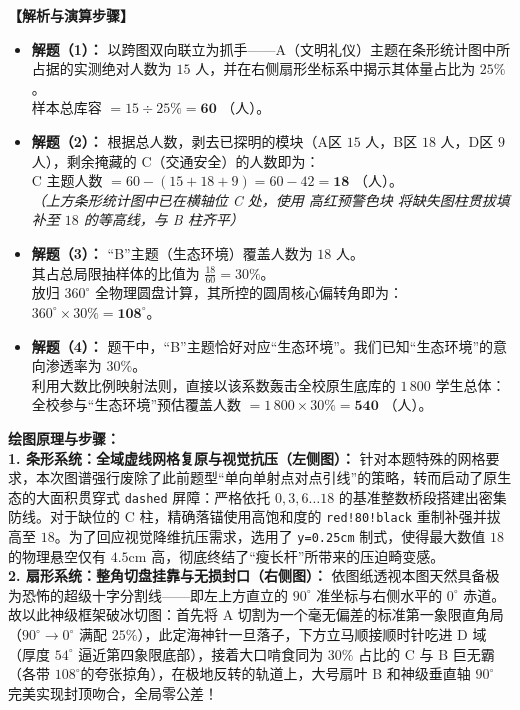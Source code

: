\documentclass[12pt, a4paper]{ctexrep}
\begin{document}
\vspace{0.4cm}
\textbf{【解析与演算步骤】}
\begin{itemize}
    \item \textbf{解题（1）：} 以跨图双向联立为抓手——A（文明礼仪）主题在条形统计图中所占据的实测绝对人数为 $15$ 人，并在右侧扇形坐标系中揭示其体量占比为 $25\%$。\\
    样本总库容 $= 15 \div 25\% = \mathbf{60}$ （人）。
    \item \textbf{解题（2）：} 根据总人数，剥去已探明的模块（A区 $15$ 人，B区 $18$ 人，D区 $9$ 人），剩余掩藏的 C（交通安全）的人数即为：\\
    C 主题人数 $= 60 - (15 + 18 + 9) = 60 - 42 = \mathbf{18}$ （人）。\\
    \textit{（上方条形统计图中已在横轴位 C 处，使用 \textcolor{red!80!black}{高红预警色块} 将缺失图柱贯拔填补至 $18$ 的等高线，与 B 柱齐平）}
    \item \textbf{解题（3）：} “B”主题（生态环境）覆盖人数为 $18$ 人。\\
    其占总局限抽样体的比值为 $\frac{18}{60} = 30\%$。\\
    放归 $360^\circ$ 全物理圆盘计算，其所控的圆周核心偏转角即为：$360^\circ \times 30\% = \mathbf{108^\circ}$。
    \item \textbf{解题（4）：} 题干中，“B”主题恰好对应“生态环境”。我们已知“生态环境”的意向渗透率为 $30\%$。\\
    利用大数比例映射法则，直接以该系数轰击全校原生底库的 $1\,800$ 学生总体：\\
    全校参与“生态环境”预估覆盖人数 $= 1\,800 \times 30\% = \mathbf{540}$ （人）。
\end{itemize}

\vspace{0.4cm}
{\small\color{blue!70!black}
\textbf{绘图原理与步骤：}\\
\textbf{1. 条形系统：全域虚线网格复原与视觉抗压（左侧图）：} 针对本题特殊的网格要求，本次图谱强行废除了此前题型“单向单射点对点引线”的策略，转而启动了原生态的大面积贯穿式 \texttt{dashed} 屏障：严格依托 $0, 3, 6 \dots 18$ 的基准整数桥段搭建出密集防线。对于缺位的 C 柱，精确落锚使用高饱和度的 \texttt{red!80!black} 重制补强并拔高至 $18$。为了回应视觉降维抗压需求，选用了 \texttt{y=0.25cm} 制式，使得最大数值 $18$ 的物理悬空仅有 $4.5\mathrm{cm}$ 高，彻底终结了“瘦长杆”所带来的压迫畸变感。\\
\textbf{2. 扇形系统：整角切盘挂靠与无损封口（右侧图）：} 依图纸透视本图天然具备极为恐怖的超级十字分割线——即左上方直立的 $90^\circ$ 准坐标与右侧水平的 $0^\circ$ 赤道。故以此神级框架破冰切图：首先将 A 切割为一个毫无偏差的标准第一象限直角局（$90^\circ \to 0^\circ$ 满配 $25\%$），此定海神针一旦落子，下方立马顺接顺时针吃进 D 域（厚度 $54^\circ$ 逼近第四象限底部），接着大口啃食同为 $30\%$ 占比的 C 与 B 巨无霸（各带 $108^\circ$的夸张掠角），在极地反转的轨道上，大号扇叶 B 和神级垂直轴 $90^\circ$ 完美实现封顶吻合，全局零公差！
}
\end{document}
